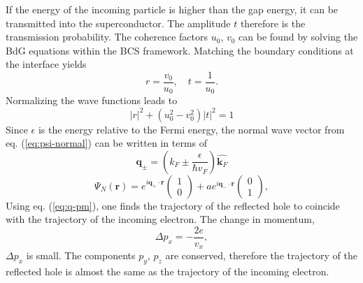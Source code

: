 If the energy of the incoming particle is higher than the gap energy, it can be transmitted into the superconductor. The amplitude $t$ therefore is the transmission probability. The coherence factors $u_0$, $v_0$ can be found by solving the BdG equations within the BCS framework. Matching the boundary conditions at the interface yields
\begin{equation}
r = \frac{v_0}{u_0}, \quad t = \frac{1}{u_0}.
\end{equation}
Normalizing the wave functions leads to 
\begin{equation}
|r|^2 + (u_0^2 - v_0^2)|t|^2 = 1
\end{equation}
Since $\epsilon$ is the energy relative to the Fermi energy, the normal wave vector from eq. (\ref{eq:psi-normal}) can be written in terms of
\begin{equation}
\mathbf{q}_\pm =  \left( k_F \pm \frac{\epsilon}{\hbar v_F} \right) \hat{\mathbf{k}_F} \label{eq:q-pm}
\end{equation}
\begin{equation}
\Psi_N \left( \mathbf{r} \right) = e^{i\mathbf{q}_+ \cdot \mathbf{r}} \begin{pmatrix} 1 \\ 0\end{pmatrix} + a e^{i\mathbf{q}_- \cdot \mathbf{r}} \begin{pmatrix} 0 \\ 1\end{pmatrix},
\end{equation}
Using eq. (\ref{eq:q-pm}), one finds the trajectory of the reflected hole to coincide with the trajectory of the incoming electron. The change in momentum,
\begin{equation}
\Delta p_x = - \frac{2 e }{v_x},
\end{equation}
$\Delta p_x$ is small. The components $p_y$, $p_z$ are conserved, therefore the trajectory of the reflected hole is almost the same as the trajectory of the incoming electron. %
